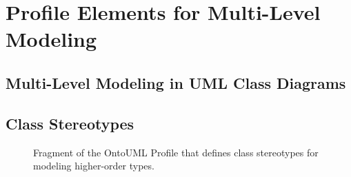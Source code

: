 \chapter{Profile Elements for Multi-Level Modeling}
\label{ch:mlt}

\section{Multi-Level Modeling in UML Class Diagrams}
\label{sec:mlt-profile-intro}



\section{Class Stereotypes}
\label{sec:mlt-profile-classes}

\begin{figure}[h]
    \centering
    
    \caption{Fragment of the OntoUML Profile that defines class stereotypes for modeling higher-order types.}
    \label{fig:multi-level-class-stereotypes}
\end{figure}

